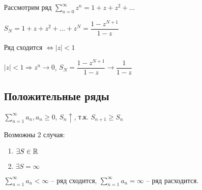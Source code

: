 \begin{example}
\begin{enumerate}
\begin{tikzpicture}[x=0.75pt,y=0.75pt,yscale=-1,xscale=1]
    
    \end{tikzpicture}
    
    Рассмотрим ряд $\sum_{n = 0}^{\infty} z^n = 1 + z + z ^ 2 + \dots$
    

    $S_N = 1 + z + z^2 + \dots + z^N = \dfrac{1 - z^{N + 1}}{1 - z}$

    Ряд сходится $\Leftrightarrow |z| < 1$
    
    $|z| < 1 \Rightarrow z^n \rightarrow 0$, $S_N = \dfrac{1 - z^{N + 1}}{1 - z} \to \dfrac{1}{1 - z}$ 
\end{enumerate}
\end{example}
\subsection{Положительные ряды}
$\sum_{n = 1}^{\infty} a_n, a_n \geq 0$, 
$S_n \uparrow$, т.к. $S_{n + 1} \geq S_{n}$

Возможны 2 случая:
\begin{enumerate}
    \item $\exists S \in \RR$
    \item $\exists S = \infty$
\end{enumerate}
\begin{designation}
    $\sum_{n = 1}^{\infty} a_n < \infty$ -- ряд сходится,
    $\sum_{n = 1}^{\infty} a_n = \infty$ -- ряд расходится.
\end{designation}
